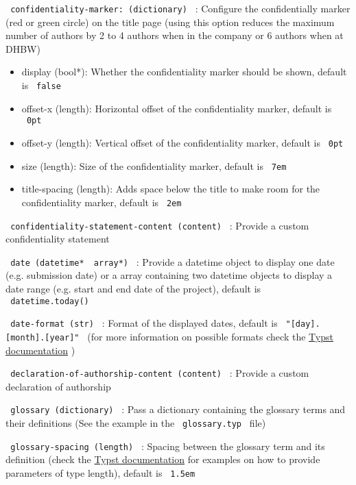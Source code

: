 \texttt{\ confidentiality-marker:\ (dictionary)\ } : Configure the
confidentially marker (red or green circle) on the title page (using
this option reduces the maximum number of authors by 2 to 4 authors when
in the company or 6 authors when at DHBW)

\begin{itemize}
\tightlist
\item
  display (bool*): Whether the confidentiality marker should be shown,
  default is \texttt{\ false\ }
\item
  offset-x (length): Horizontal offset of the confidentiality marker,
  default is \texttt{\ 0pt\ }
\item
  offset-y (length): Vertical offset of the confidentiality marker,
  default is \texttt{\ 0pt\ }
\item
  size (length): Size of the confidentiality marker, default is
  \texttt{\ 7em\ }
\item
  title-spacing (length): Adds space below the title to make room for
  the confidentiality marker, default is \texttt{\ 2em\ }
\end{itemize}

\texttt{\ confidentiality-statement-content\ (content)\ } : Provide a
custom confidentiality statement

\texttt{\ date\ (datetime*\ \textbar{}\ array*)\ } : Provide a datetime
object to display one date (e.g. submission date) or a array containing
two datetime objects to display a date range (e.g. start and end date of
the project), default is \texttt{\ datetime.today()\ }

\texttt{\ date-format\ (str)\ } : Format of the displayed dates, default
is \texttt{\ "{[}day{]}.{[}month{]}.{[}year{]}"\ } (for more information
on possible formats check the
\href{https://typst.app/docs/reference/foundations/datetime/\#format}{Typst
documentation} )

\texttt{\ declaration-of-authorship-content\ (content)\ } : Provide a
custom declaration of authorship

\texttt{\ glossary\ (dictionary)\ } : Pass a dictionary containing the
glossary terms and their definitions (See the example in the
\texttt{\ glossary.typ\ } file)

\texttt{\ glossary-spacing\ (length)\ } : Spacing between the glossary
term and its definition (check the
\href{https://typst.app/docs/reference/layout/length/}{Typst
documentation} for examples on how to provide parameters of type
length), default is \texttt{\ 1.5em\ }

